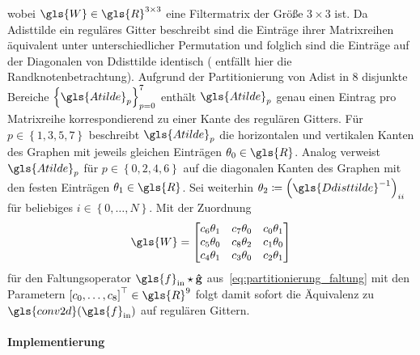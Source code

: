 wobei $\gls{W} \in \gls{R}^{3 \times 3}$ eine Filtermatrix der Größe $3 \times 3$ ist.
Da \gls{Adisttilde} ein reguläres Gitter beschreibt sind die Einträge ihrer Matrixreihen äquivalent unter unterschiedlicher Permutation und folglich sind die Einträge auf der Diagonalen von \gls{Ddisttilde} identisch (\oBdA{} entfällt hier die Randknotenbetrachtung).
Aufgrund der Partitionierung von \gls{Adist} in $8$ disjunkte Bereiche ${\left\{\gls{Atilde}_p\right\}}_{p=0}^7$ enthält $\gls{Atilde}_p$ genau einen Eintrag pro Matrixreihe korrespondierend zu einer Kante des regulären Gitters.
Für $p \in \left\{1, 3, 5, 7\right\}$ beschreibt $\gls{Atilde}_p$ die horizontalen und vertikalen Kanten des Graphen mit jeweils gleichen Einträgen $\theta_0 \in \gls{R}$.
Analog verweist $\gls{Atilde}_p$ für $p \in \left\{0, 2, 4, 6\right\}$ auf die diagonalen Kanten des Graphen mit den festen Einträgen $\theta_1 \in \gls{R}$.
Sei weiterhin \oBdA{} $\theta_2 \coloneqq {\left(\gls{Ddisttilde}^{-1}\right)}_{ii}$ für beliebiges $i \in \left\{0, \ldots, N\right\}$.
Mit der Zuordnung
\begin{equation*}
  \gls{W} = \begin{bmatrix}
    c_6\theta_1 & c_7\theta_0 & c_0\theta_1\\
    c_5\theta_0 & c_8\theta_2 & c_1\theta_0\\
    c_4\theta_1 & c_3\theta_0 & c_2\theta_1
  \end{bmatrix}
\end{equation*}
  für den Faltungsoperator $\gls{f}_{\mathrm{in}} \star \ve{\hat g}$ aus~\eqref{eq:partitionierung_faltung} mit den Parametern ${\left[c_0, \ldots, c_8\right]}^{\top} \in \gls{R}^9$
folgt damit sofort die Äquivalenz zu $\gls{conv2d}\left(\gls{f}_{\mathrm{in}}\right)$ auf regulären Gittern.

\paragraph{Implementierung}
\label{partitionierung_implementierung}

